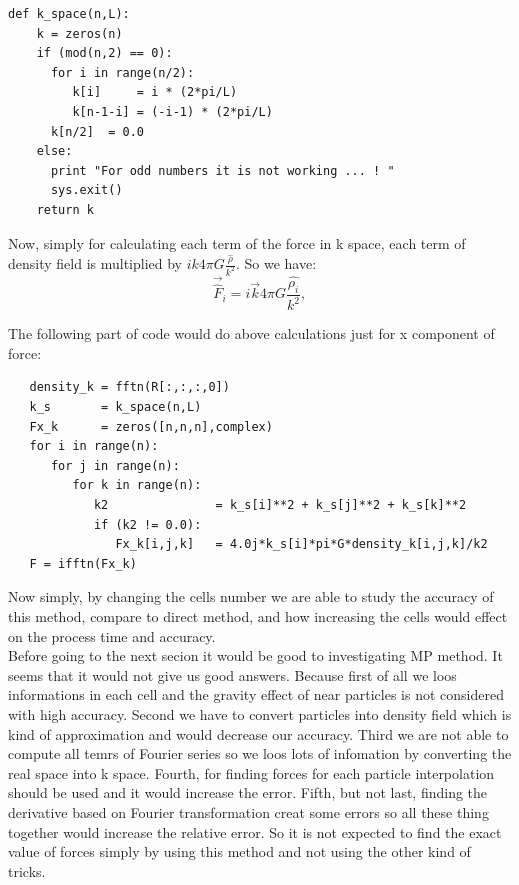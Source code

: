\documentclass[10pt]{article}
\begin{document}
\begin{verbatim}
def k_space(n,L):
    k = zeros(n)
    if (mod(n,2) == 0):
      for i in range(n/2):
         k[i]     = i * (2*pi/L)
         k[n-1-i] = (-i-1) * (2*pi/L)
      k[n/2]  = 0.0
    else:
      print "For odd numbers it is not working ... ! "
      sys.exit()
    return k
\end{verbatim}

Now, simply for calculating each term of the force in k space, each term of density field is multiplied by $i k 4\pi G\frac{\hat{\rho}}{k^2}$. So we have:\\

\begin{equation}
    \vec{\hat{F}}_i = i \vec{k} 4\pi G\frac{\hat{\rho_i}}{k^2},
\end{equation}

The following part of code would do above calculations just for x component of force:

\begin{verbatim}
   density_k = fftn(R[:,:,:,0])
   k_s       = k_space(n,L)
   Fx_k      = zeros([n,n,n],complex)
   for i in range(n):
      for j in range(n):
         for k in range(n):
            k2               = k_s[i]**2 + k_s[j]**2 + k_s[k]**2
            if (k2 != 0.0):
               Fx_k[i,j,k]   = 4.0j*k_s[i]*pi*G*density_k[i,j,k]/k2 
   F = ifftn(Fx_k)
\end{verbatim}

Now simply, by changing the cells number we are able to study the accuracy of this method, compare to direct method, and how increasing the cells would effect on the process time and accuracy. \\

Before going to the next secion it would be good to investigating MP method. It seems that it would not give us good answers. Because first of all we loos informations in each cell and the gravity effect of near particles is not considered with high accuracy. Second we have to convert particles into density field which is kind of approximation and would decrease our accuracy. Third we are not able to compute all temrs of Fourier series so we loos lots of infomation by converting the real space into k space. Fourth, for finding forces for each particle interpolation should be used and it would increase the error. Fifth, but not last, finding the derivative based on Fourier transformation creat some errors so all these thing together would increase the relative error. So it is not expected to find the exact value of forces simply by using this method and not using the other kind of tricks.\\
\end{document}
